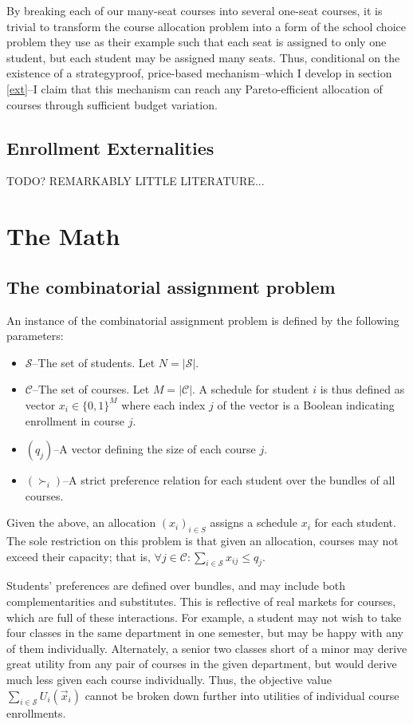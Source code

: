 \documentclass{article}
\begin{document}
By breaking each of our many-seat courses into several one-seat courses, it is trivial to transform the course allocation problem into a form of the school choice problem they use as their example such that each seat is assigned to only one student, but each student may be assigned many seats. Thus, conditional on the existence of a strategyproof, price-based mechanism--which I develop in section \ref{ext}--I claim that this mechanism can reach any Pareto-efficient allocation of courses through sufficient budget variation.

\subsection{Enrollment Externalities}

TODO? REMARKABLY LITTLE LITERATURE...

\section{The Math}

\subsection{The combinatorial assignment problem}
\label{basicCA}
An instance of the combinatorial assignment problem is defined by the following parameters:
\begin{itemize}
    \item $\mathcal{S}$--The set of students. Let $N = |\mathcal{S}|$.
    \item $\mathcal{C}$--The set of courses. Let $M = |\mathcal{C}|$. A schedule for student $i$ is thus defined as vector $x_i \in \{0, 1\}^M$ where each index $j$ of the vector is a Boolean indicating enrollment in course $j$.  
    \item $(q_j)$--A vector defining the size of each course $j$.
    \item $(\succ_i)$--A strict preference relation for each student over the bundles of all courses. 
\end{itemize}

Given the above, an allocation $(x_i)_{i \in S}$ assigns a schedule $x_i$ for each student. The sole restriction on this problem is that given an allocation, courses may not exceed their capacity; that is, $\forall j \in \mathcal{C} : \sum_{i \in \mathcal{S}} x_{ij} \leq q_j$.

Students' preferences are defined over bundles, and may include both complementarities and substitutes. This is reflective of real markets for courses, which are full of these interactions. For example, a student may not wish to take four classes in the same department in one semester, but may be happy with any of them individually. Alternately, a senior two classes short of a minor may derive great utility from any pair of courses in the given department, but would derive much less given each course individually. Thus, the objective value $\sum_{i \in \mathcal{S}} U_i(\vec{x}_i)$ cannot be broken down further into utilities of individual course enrollments.
\end{document}
